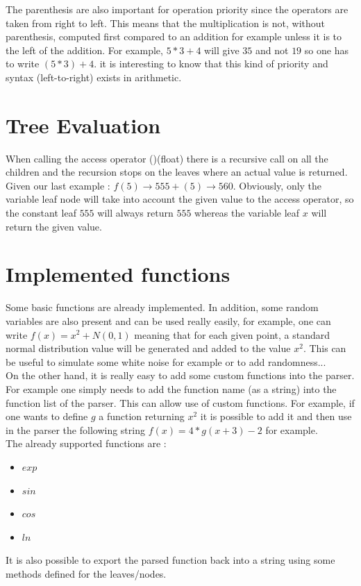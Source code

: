 \documentclass[a4paper]{report}
\begin{document}
The parenthesis are also important for operation priority since the operators are taken from right to left. This means that the multiplication is not, without parenthesis, computed first compared to an addition for example unless it is to the left of the addition. For example, $5*3+4$ will give $35$ and not $19$ so one has to write $(5*3)+4$.
it is interesting to know that this kind of priority and syntax (left-to-right) exists in arithmetic.
\section{Tree Evaluation}
When calling the access operator ()(float) there is a recursive call on all the children and the recursion stops on the leaves where an actual value is returned. Given our last example : $f(5) \rightarrow 555+(5)\rightarrow 560$. Obviously, only the variable leaf node will take into account the given value to the access operator, so the constant leaf $555$ will always return $555$ whereas the variable leaf $x$ will return the given value. 

\section{Implemented functions}
Some basic functions are already implemented. In addition, some random variables are also present and can be used really easily, for example, one can write $f(x)=x^2+N(0,1)$ meaning that for each given point, a standard normal distribution value will be generated and added to the value $x^2$. This can be useful to simulate some white noise for example or to add randomness...
\\
On the other hand, it is really easy to add some custom functions into the parser. For example one simply needs to add the function name (as a string) into the function list of the parser. This can allow use of custom functions. For example, if one wants to define $g$ a function returning $x^2$ it is possible to add it and then use in the parser the following string $f(x)=4*g(x+3)-2$ for example.\\
The already supported functions are :
\begin{itemize}
\item $exp$
\item $sin$
\item $cos$
\item $ln$
\end{itemize}

It is also possible to export the parsed function back into a string using some methods defined for the leaves/nodes. 
\end{document}
